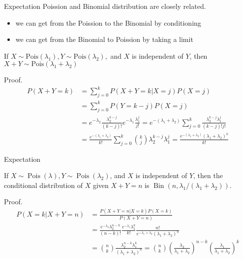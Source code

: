 \documentclass[8pt]{beamer}
\newcommand{\pois}[1]{\text{Pois}(#1)}
\newcommand{\mypois}[1]{\operatorname{Pois}(#1)}
\newcommand{\mybin}[2]{\operatorname{Bin}\!\left(#1,#2\right)}
\begin{document}
\begin{frame}{Expectation}
    Poission and Binomial distribution are closely related.
    \begin{itemize}
        \item we can get from the Poission to the Binomial by conditioning
        \item we can get from the Binomial to Poission by taking a limit
    \end{itemize}

    \begin{theorem}
        If \(X \sim \text{Pois}(\lambda_1), Y \sim \text{Pois}(\lambda_2),\) and \(X\) is independent of \(Y\), then \(X + Y \sim \pois{\lambda_1 + \lambda_2}\)
    \end{theorem}
    Proof.
    \[
        \begin{aligned}
            P(X+Y=k) &= \sum_{j=0}^k P(X+Y=k|X=j) P(X=j)\\
            &= \sum_{j=0}^k P(Y=k-j) P(X=j) \\
            &= e^{-\lambda_2} \frac{\lambda_2^{k-j}}{(k-j)!} e^{-\lambda_1} \frac{\lambda_1^{j}}{j!} = e^{-(\lambda_1+\lambda_2)} \sum_{j=0}^k \frac{\lambda_2^{k-j} \lambda_1^{j}}{(k-j)! j!} \\
            &= \frac{e^{-(\lambda_1 + \lambda_2)}}{k!} \sum_{j=0}^k \binom{k}{j} \lambda_2^{k-j} \lambda_1^j = \frac{e^{-(\lambda_1 + \lambda_2)} (\lambda_1 + \lambda_2)^k}{k!}
        \end{aligned}
    \]
\end{frame}


\begin{frame}{Expectation}
    \begin{theorem}
        If \(X \sim \mypois{\lambda}, Y \sim \mypois{\lambda_2}\), and \(X\) is independent of \(Y\), then the conditional distribution of \(X\) given \(X+Y=n\) is \(\mybin{n}{\lambda_1 / (\lambda_1 + \lambda_2)}\).
    \end{theorem}
    Proof. 
    \[
    \begin{aligned}
        P(X=k|X+Y=n) &= \frac{P(X+Y=n|X=k)P(X=k)}{P(X+Y=n)} \\
        &= \frac{e^{-\lambda_2}\lambda_2^{n-k}}{(n-k)!} \frac{e^{-\lambda_1} \lambda_1^{k}}{k!} \frac{n!}{e^{-\lambda_1 + \lambda_2}(\lambda_1 + \lambda_2)^{n}} \\
        &= \binom{n}{k} \frac{\lambda_2^{n-k}\lambda_1^{k}}{(\lambda_1 +\lambda_2)^{n}} = \binom{n}{k} \left(\frac{\lambda_2}{\lambda_1+\lambda_2}\right)^{n-k} \left(\frac{\lambda_1}{\lambda_1 + \lambda_2}\right)^k
    
    \end{aligned}
    \]
\end{frame}
\end{document}
